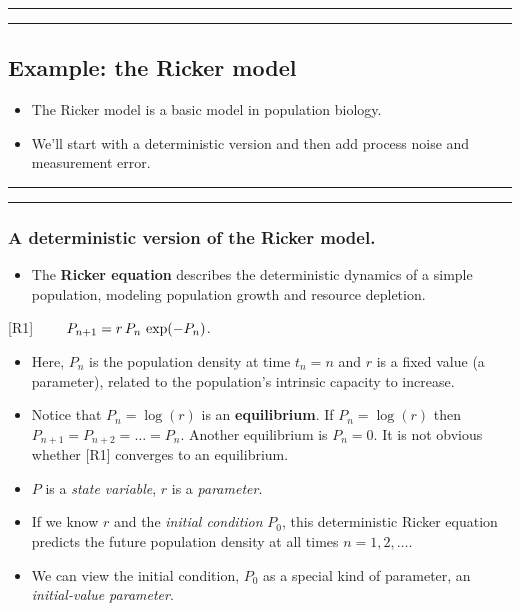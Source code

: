 \documentclass[]{article}
\providecommand{\tightlist}{%
  \setlength{\itemsep}{0pt}\setlength{\parskip}{0pt}}
\begin{document}
\begin{center}\rule{0.5\linewidth}{\linethickness}\end{center}

\begin{center}\rule{0.5\linewidth}{\linethickness}\end{center}

\subsection{Example: the Ricker model}\label{example-the-ricker-model}

\begin{itemize}
\item
  The Ricker model is a basic model in population biology.
\item
  We'll start with a deterministic version and then add process noise
  and measurement error.
\end{itemize}

\begin{center}\rule{0.5\linewidth}{\linethickness}\end{center}

\begin{center}\rule{0.5\linewidth}{\linethickness}\end{center}

\subsubsection{A deterministic version of the Ricker
model.}\label{a-deterministic-version-of-the-ricker-model.}

\begin{itemize}
\tightlist
\item
  The \textbf{Ricker equation} describes the deterministic dynamics of a
  simple population, modeling population growth and resource depletion.
\end{itemize}

{[}R1{]} \(\quad\quad \displaystyle P_{n+1} = r\,P_{n}\,\exp(-P_{n})\).

\begin{itemize}
\item
  Here, \(P_n\) is the population density at time \(t_n=n\) and \(r\) is
  a fixed value (a parameter), related to the population's intrinsic
  capacity to increase.
\item
  Notice that \(P_n=\log(r)\) is an \textbf{equilibrium}. If
  \(P_n=\log(r)\) then \(P_{n+1}=P_{n+2}=\dots = P_n\). Another
  equilibrium is \(P_n=0\). It is not obvious whether {[}R1{]} converges
  to an equilibrium.
\item
  \(P\) is a \emph{state variable}, \(r\) is a \emph{parameter}.
\item
  If we know \(r\) and the \emph{initial condition} \(P_0\), this
  deterministic Ricker equation predicts the future population density
  at all times \(n=1,2,\dots\).
\item
  We can view the initial condition, \(P_0\) as a special kind of
  parameter, an \emph{initial-value parameter}.
\end{itemize}
\end{document}
